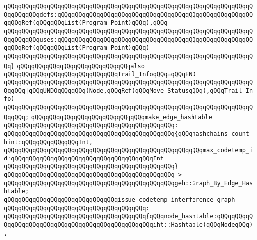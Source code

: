 \verb|qQQqqQQqqQQqqQQqqQQqqQQqqQQqqQQqqQQqqQQqqQQqqQQqqQQqqQQqqQQqqQQqqQQqqQQqqQQqqQQqdefs:qQQqqQQqqQQqqQQqqQQqqQQqqQQqqQQqqQQqqQQqqQQqqQQqqQQqqQQqqQQqRef(qQQqqQQqList(Program_Point)qQQq),qQQq|\newline
\verb|qQQqqQQqqQQqqQQqqQQqqQQqqQQqqQQqqQQqqQQqqQQqqQQqqQQqqQQqqQQqqQQqqQQqqQQqqQQqqQQquses:qQQqqQQqqQQqqQQqqQQqqQQqqQQqqQQqqQQqqQQqqQQqqQQqqQQqqQQqqQQqRef(qQQqqQQqList(Program_Point)qQQq)|\newline
\verb|qQQqqQQqqQQqqQQqqQQqqQQqqQQqqQQqqQQqqQQqqQQqqQQqqQQqqQQqqQQqqQQqqQQqqQQq}|\newline
\newline
\verb|qQQqqQQqqQQqqQQqqQQqqQQqqQQqqQQqalso|\newline
\verb|qQQqqQQqqQQqqQQqqQQqqQQqqQQqqQQqTrail_InfoqQQq=qQQqEND|\newline
\verb|qQQqqQQqqQQqqQQqqQQqqQQqqQQqqQQqqQQqqQQqqQQqqQQqqQQqqQQqqQQqqQQqqQQqqQQqqQQq|\verb#|qQQqUNDOqQQqqQQq(Node,qQQqRef(qQQqMove_StatusqQQq),qQQqTrail_Info)#\newline
\verb|qQQqqQQqqQQqqQQqqQQqqQQqqQQqqQQqqQQqqQQqqQQqqQQqqQQqqQQqqQQqqQQqqQQqqQQqqQQq;|\newline
\newline
\newline
\newline
\verb|qQQqqQQqqQQqqQQqqQQqqQQqqQQqqQQqmake_edge_hashtable|\newline
\verb|qQQqqQQqqQQqqQQqqQQqqQQqqQQqqQQqqQQqqQQqqQQqqQQq:|\newline
\verb|qQQqqQQqqQQqqQQqqQQqqQQqqQQqqQQqqQQqqQQqqQQqqQQq{qQQqhashchains_count_hint:qQQqqQQqqQQqqQQqInt,|\newline
\verb|qQQqqQQqqQQqqQQqqQQqqQQqqQQqqQQqqQQqqQQqqQQqqQQqqQQqqQQqmax_codetemp_id:qQQqqQQqqQQqqQQqqQQqqQQqqQQqqQQqqQQqqQQqInt|\newline
\verb|qQQqqQQqqQQqqQQqqQQqqQQqqQQqqQQqqQQqqQQqqQQqqQQq}|\newline
\verb|qQQqqQQqqQQqqQQqqQQqqQQqqQQqqQQqqQQqqQQqqQQqqQQq->|\newline
\verb|qQQqqQQqqQQqqQQqqQQqqQQqqQQqqQQqqQQqqQQqqQQqqQQqgeh::Graph_By_Edge_Hashtable;|\newline
\newline
\newline
\newline
\verb|qQQqqQQqqQQqqQQqqQQqqQQqqQQqqQQqissue_codetemp_interference_graph|\newline
\verb|qQQqqQQqqQQqqQQqqQQqqQQqqQQqqQQqqQQqqQQq:|\newline
\verb|qQQqqQQqqQQqqQQqqQQqqQQqqQQqqQQqqQQqqQQq{qQQqnode_hashtable:qQQqqQQqqQQqqQQqqQQqqQQqqQQqqQQqqQQqqQQqqQQqqQQqqQQqiht::Hashtable(qQQqNodeqQQq),|\newline
